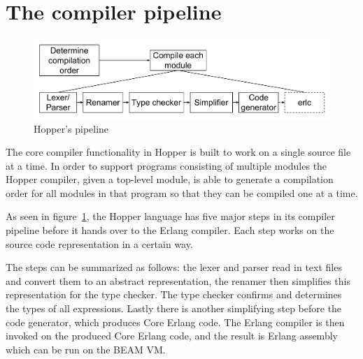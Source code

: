 \section{The compiler pipeline}



\begin{figure}[h!]
\centering
  \includegraphics[width=0.6\pdfpagewidth]{figure/pipeline}
  \caption{Hopper's pipeline}
  \label{fig:pipeline}
\end{figure}


The core compiler functionality in Hopper is built to work on a single source file at a time.
In order to support programs consisting of multiple modules the Hopper compiler,
given a top-level module, is able to generate a compilation order for all modules in that
program so that they can be compiled one at a time.

As seen in figure~\ref{fig:pipeline}, the Hopper language has five major steps in its compiler
pipeline before it hands over to the Erlang compiler. Each step works on the 
source code representation in a certain way.

The steps can be summarized as follows: the lexer and parser read in text files and convert
them to an abstract representation, the renamer then simplifies this representation for the 
type checker. The type checker confirms and determines the types of all expressions. Lastly 
there is another simplifying step before the code generator, which produces Core
Erlang code. The Erlang compiler is then invoked on the produced Core Erlang
code, and the result is Erlang assembly which can be run on the BEAM VM.